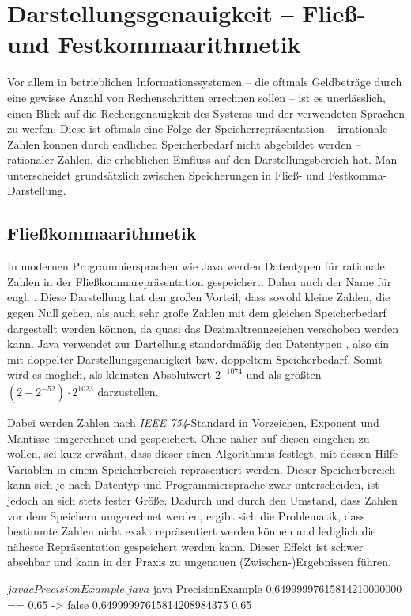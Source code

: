 \section{Darstellungsgenauigkeit -- Fließ- und Festkommaarithmetik}
Vor allem in betrieblichen Informationssystemen -- die oftmals Geldbeträge durch eine gewisse Anzahl von Rechenschritten errechnen sollen -- ist es unerlässlich, einen Blick auf die Rechengenauigkeit des Systems und der verwendeten Sprachen zu werfen. Diese ist oftmals eine Folge der Speicherrepräsentation -- irrationale Zahlen können durch endlichen Speicherbedarf nicht abgebildet werden -- rationaler Zahlen, die erheblichen Einfluss auf den Darstellungsbereich hat. Man unterscheidet grundsätzlich zwischen Speicherungen in Fließ- und Festkomma-Darstellung.
 
\subsection*{Fließkommaarithmetik}
In modernen Programmiersprachen wie Java werden Datentypen für rationale Zahlen in der Fließkommarepräsentation gespeichert. Daher auch der Name  für engl. . Diese Darstellung hat den großen Vorteil, dass sowohl kleine Zahlen, die gegen Null gehen, als auch sehr große Zahlen mit dem gleichen Speicherbedarf dargestellt werden können, da quasi das Dezimaltrennzeichen verschoben werden kann. Java verwendet zur Dartellung standardmäßig den Datentypen , also ein  mit doppelter Darstellungsgenauigkeit bzw. doppeltem Speicherbedarf. Somit wird es möglich, als kleinsten Absolutwert $2^{-1074}$ und als größten $(2 - 2^{-52}) \cdot 2^{1023}$ darzustellen.

Dabei werden Zahlen nach \textit{IEEE 754}-Standard in Vorzeichen, Exponent und Mantisse umgerechnet und gespeichert. Ohne näher auf diesen eingehen zu wollen, sei kurz erwähnt, dass dieser einen Algorithmus festlegt, mit dessen Hilfe Variablen in einem Speicherbereich repräsentiert werden. Dieser Speicherbereich kann sich je nach Datentyp und Programmiersprache zwar unterscheiden, ist jedoch an sich stets fester Größe. Dadurch und durch den Umstand, dass Zahlen vor dem Speichern umgerechnet werden, ergibt sich die Problematik, dass bestimmte Zahlen nicht exakt repräsentiert werden können und lediglich die näheste Repräsentation gespeichert werden kann. Dieser Effekt ist schwer absehbar und kann in der Praxis zu ungenauen (Zwischen-)Ergebnissen führen.

\sepCodeAndOutputCheck
\begin{shellwindow}
$ javac PrecisionExample.java 
$ java PrecisionExample
0,64999997615814210000000 == 0.65 -> false
0.64999997615814208984375
0.65
\end{shellwindow}

